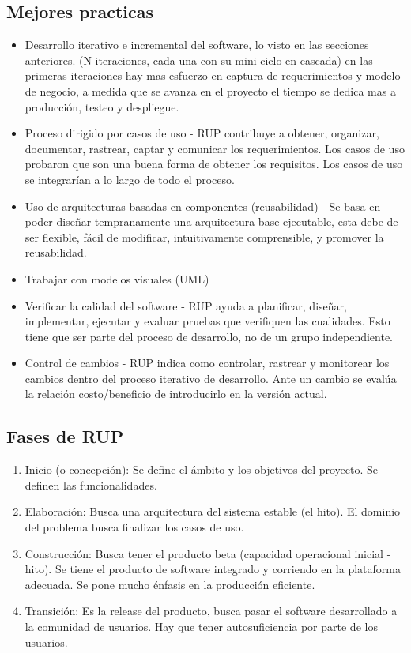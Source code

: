 \documentclass[titlepage,a4paper]{article}
\begin{document}
\subsection*{Mejores practicas}
\begin{itemize}
    \item Desarrollo iterativo e incremental del software, lo visto en las secciones anteriores. (N iteraciones, cada una con su mini-ciclo en cascada) en las primeras iteraciones hay mas esfuerzo en captura de requerimientos y modelo de negocio, a medida que se avanza en el proyecto el tiempo se dedica mas a producción, testeo y despliegue. 
    \item Proceso dirigido por casos de uso - RUP contribuye a obtener, organizar, documentar, rastrear, captar y comunicar los requerimientos. Los casos de uso probaron que son una buena forma de obtener los requisitos. Los casos de uso se integrarían a lo largo de todo el proceso.
    \item Uso de arquitecturas basadas en componentes (reusabilidad) - Se basa en poder diseñar tempranamente una arquitectura base ejecutable, esta debe de ser flexible, fácil de modificar, intuitivamente comprensible, y promover la reusabilidad.
    \item Trabajar con modelos visuales (UML)
    \item Verificar la calidad del software - RUP ayuda a planificar, diseñar, implementar, ejecutar y evaluar pruebas que verifiquen las cualidades. Esto tiene que ser parte del proceso de desarrollo, no de un grupo independiente.
    \item Control de cambios - RUP indica como controlar, rastrear y monitorear los cambios dentro del proceso iterativo de desarrollo. Ante un cambio se evalúa la relación costo/beneficio de introducirlo en la versión actual.
\end{itemize}


\subsection*{Fases de RUP}
\begin{enumerate}
    \item Inicio (o concepción): Se define el ámbito y los objetivos del proyecto. Se definen las funcionalidades. %
    \item Elaboración: Busca una arquitectura del sistema estable (el hito). El dominio del problema busca finalizar los casos de uso. %
    \item Construcción: Busca tener el producto beta (capacidad operacional inicial - hito). Se tiene el producto de software integrado y corriendo en la plataforma adecuada. Se pone mucho énfasis en la producción eficiente.
    \item Transición: Es la release del producto, busca pasar el software desarrollado a la comunidad de usuarios. Hay que tener autosuficiencia por parte de los usuarios.
\end{enumerate}
\end{document}
